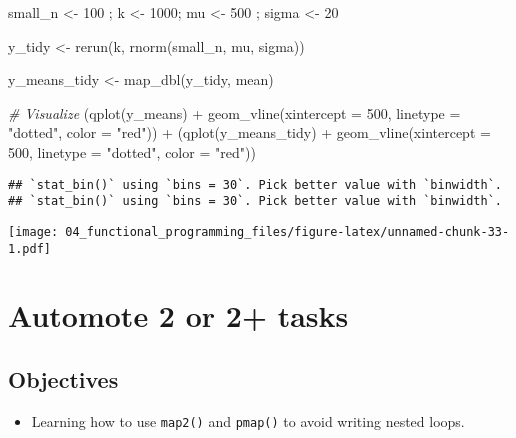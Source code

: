 \documentclass[
]{book}
\newenvironment{Shaded}{\begin{snugshade}}{\end{snugshade}}
\newcommand{\AttributeTok}[1]{\textcolor[rgb]{0.77,0.63,0.00}{#1}}
\newcommand{\CommentTok}[1]{\textcolor[rgb]{0.56,0.35,0.01}{\textit{#1}}}
\newcommand{\DecValTok}[1]{\textcolor[rgb]{0.00,0.00,0.81}{#1}}
\newcommand{\FunctionTok}[1]{\textcolor[rgb]{0.00,0.00,0.00}{#1}}
\newcommand{\NormalTok}[1]{#1}
\newcommand{\OtherTok}[1]{\textcolor[rgb]{0.56,0.35,0.01}{#1}}
\newcommand{\SpecialCharTok}[1]{\textcolor[rgb]{0.00,0.00,0.00}{#1}}
\newcommand{\StringTok}[1]{\textcolor[rgb]{0.31,0.60,0.02}{#1}}
\providecommand{\tightlist}{%
  \setlength{\itemsep}{0pt}\setlength{\parskip}{0pt}}
\begin{document}
\begin{Shaded}
\begin{Highlighting}[]
\NormalTok{small\_n }\OtherTok{\textless{}{-}} \DecValTok{100}\NormalTok{ ; k }\OtherTok{\textless{}{-}} \DecValTok{1000}\NormalTok{; mu }\OtherTok{\textless{}{-}} \DecValTok{500}\NormalTok{ ; sigma }\OtherTok{\textless{}{-}} \DecValTok{20} 

\NormalTok{y\_tidy }\OtherTok{\textless{}{-}} \FunctionTok{rerun}\NormalTok{(k, }\FunctionTok{rnorm}\NormalTok{(small\_n, mu, sigma)) }

\NormalTok{y\_means\_tidy }\OtherTok{\textless{}{-}} \FunctionTok{map\_dbl}\NormalTok{(y\_tidy, mean)}

\CommentTok{\# Visualize }
\NormalTok{(}\FunctionTok{qplot}\NormalTok{(y\_means) }\SpecialCharTok{+}
   \FunctionTok{geom\_vline}\NormalTok{(}\AttributeTok{xintercept =} \DecValTok{500}\NormalTok{, }\AttributeTok{linetype =} \StringTok{"dotted"}\NormalTok{, }\AttributeTok{color =} \StringTok{"red"}\NormalTok{)) }\SpecialCharTok{+}
\NormalTok{(}\FunctionTok{qplot}\NormalTok{(y\_means\_tidy) }\SpecialCharTok{+}
   \FunctionTok{geom\_vline}\NormalTok{(}\AttributeTok{xintercept =} \DecValTok{500}\NormalTok{, }\AttributeTok{linetype =} \StringTok{"dotted"}\NormalTok{, }\AttributeTok{color =} \StringTok{"red"}\NormalTok{))}
\end{Highlighting}
\end{Shaded}

\begin{verbatim}
## `stat_bin()` using `bins = 30`. Pick better value with `binwidth`.
## `stat_bin()` using `bins = 30`. Pick better value with `binwidth`.
\end{verbatim}

\texttt{[image: 04\_functional\_programming\_files/figure-latex/unnamed-chunk-33-1.pdf]}

\hypertarget{map2}{%
\section{Automote 2 or 2+ tasks}\label{map2}}

\hypertarget{objectives-1}{%
\subsection{Objectives}\label{objectives-1}}

\begin{itemize}
\tightlist
\item
  Learning how to use \texttt{map2()} and \texttt{pmap()} to avoid writing nested loops.
\end{itemize}
\end{document}

